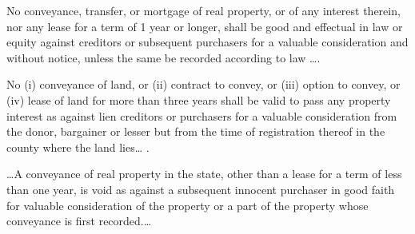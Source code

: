 


No conveyance, transfer, or mortgage of real property, or of any interest
therein, nor any lease for a term of 1 year or longer, shall be good and
effectual in law or equity against creditors or subsequent purchasers for a
valuable consideration and without notice, unless the same be recorded
according to law \dots.


No (i) conveyance of land, or (ii) contract to convey, or (iii) option to
convey, or (iv) lease of land for more than three years shall be valid to pass
any property interest as against lien creditors or purchasers for a valuable
consideration from the donor, bargainer or lesser but from the time of
registration thereof in the county where the land lies\dots{} .


\dots A conveyance of real property in the state, other than a lease for a
term of less than one year, is void as against a subsequent innocent purchaser
in good faith for valuable consideration of the property or a part of the
property whose conveyance is first recorded.\dots


